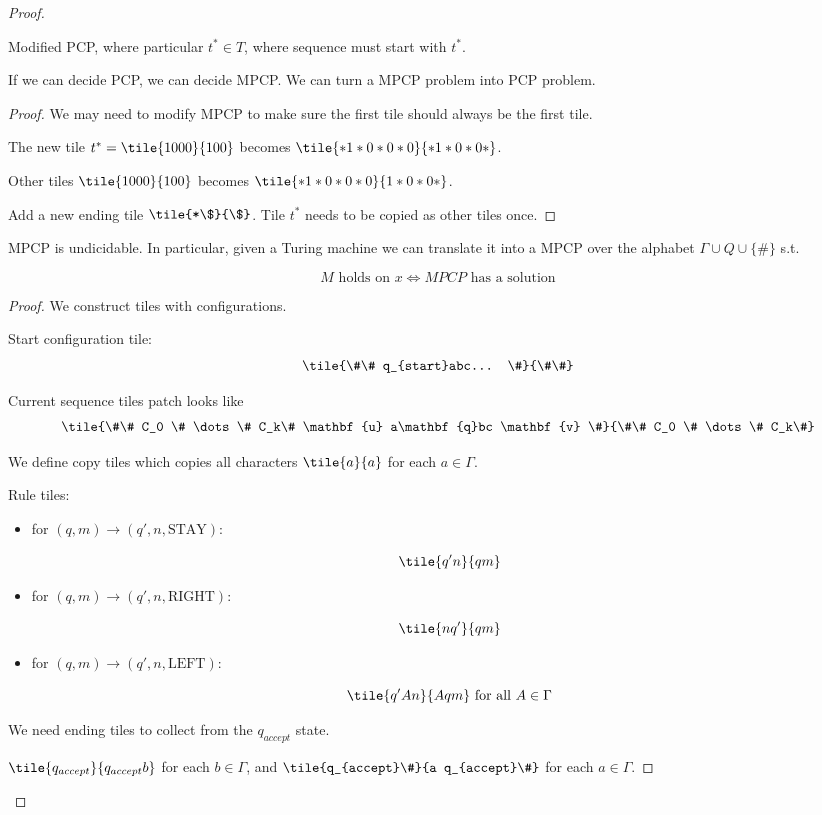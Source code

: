 \begin{proof}
\begin{definition}[MPCP]
Modified PCP, where particular $t^* \in T$, where sequence must start with $t^*$.
\end{definition}

\begin{lemma}
If we can decide PCP, we can decide MPCP. We can turn a MPCP problem into PCP problem.
\end{lemma}

\begin{proof}
We may need to modify MPCP to make sure the first tile should always be the first tile.

The new tile $t^* = \tile{1000}{100}$ becomes $\tile{*1*0*0*0}{*1*0*0*}$. 

Other tiles $\tile{1000}{100}$ becomes $\tile{*1*0*0*0}{1*0*0*}$.

Add a new ending tile $\tile{*\$}{\$}$. Tile $t^*$ needs to be copied as other tiles once.
\end{proof}

\begin{theorem}
MPCP is undicidable. In particular, given a Turing machine we can translate it into a MPCP over the alphabet $\Gamma \cup Q \cup \{\#\}$ s.t.

$$M \text{ holds on } x \Leftrightarrow MPCP \text{ has a solution}$$
\end{theorem}

\begin{proof}
We construct tiles with configurations.

Start configuration tile: $$\tile{\#\# q_{start}abc... \#}{\#\#}$$

Current sequence tiles patch looks like $$\tile{\#\# C_0 \# \dots \# C_k\# \mathbf{u} a\mathbf{q}bc \mathbf{v} \#}{\#\# C_0 \# \dots \# C_k\#}$$

We define copy tiles which copies all characters $\tile{a}{a}$ for each $a \in \Gamma$.

Rule tiles:
\begin{itemize}
    \item for $(q,m) \rightarrow (q', n, \text{STAY})$:
    
    $$\tile{q'n}{qm}$$
    
    \item for $(q,m) \rightarrow (q', n, \text{RIGHT})$:
    
    $$\tile{nq'}{qm}$$
    \item for $(q,m) \rightarrow (q', n, \text{LEFT})$:
    
    $$\tile{q'An}{Aqm} \text{ for all } A \in \Gamma$$
\end{itemize}

We need ending tiles to collect from the $q_{accept}$ state.

$\tile{q_{accept}}{q_{accept}b}$ for each $b \in \Gamma$, and $\tile{q_{accept}\#}{a q_{accept}\#}$ for each $a \in \Gamma$.

\end{proof}

\end{proof}